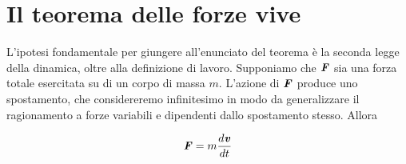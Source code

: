 






\section{Il teorema delle forze vive}
L'ipotesi fondamentale per giungere all'enunciato del teorema
è la seconda legge della dinamica, oltre alla definizione di lavoro.
Supponiamo che $\textbf{\textit{F}}$ sia una forza totale esercitata su
di un corpo di massa $m$. L'azione di $\textbf{\textit{F}}$ produce uno
spostamento, che considereremo infinitesimo in modo da generalizzare
il ragionamento a forze variabili e dipendenti dallo spostamento
stesso. Allora

\[ \textbf{\textit{F}} = m\frac{d\textbf{\textit{v}}}{dt} \]

